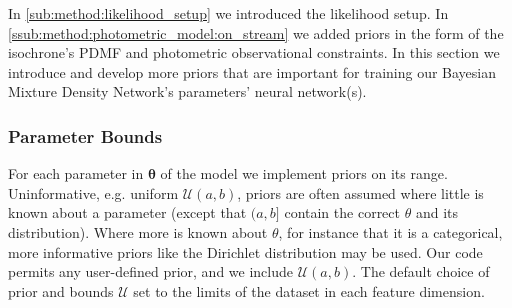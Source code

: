 \documentclass[twocolumn]{aastex631}
\newcommand{\mbs}[1]{\boldsymbol{#1}}
\newcommand{\mcal}[1]{\mathcal{#1}}
\begin{document}
        In \autoref{sub:method:likelihood_setup} we introduced the likelihood
        setup. In \autoref{ssub:method:photometric_model:on_stream} we added
        priors in the form of the isochrone's PDMF and photometric observational
        constraints. In this section we introduce and develop more priors that
        are important for training our Bayesian Mixture Density Network's
        parameters' neural network(s).

        \subsubsection{Parameter Bounds} \label{ssub:methods:priors:parameter_bounds}

            For each parameter in $\mbs{\theta}$ of the model we implement
            priors on its range.  Uninformative, e.g. uniform $\mcal{U}(a, b)$,
            priors are often assumed where little is known about a parameter
            (except that $(a,b]$ contain the correct $\theta$ and its
            distribution). Where more is known about $\theta$, for instance that
            it is a categorical, more informative priors like the Dirichlet
            distribution \citep{Christopher2016} may be used.  Our code permits
            any user-defined prior, and we include $\mcal{U}(a, b)$.  The
            default choice of prior and bounds $\mcal{U}$ set to the limits of
            the dataset in each feature dimension.
\end{document}
